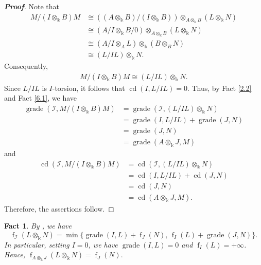 \documentclass[10pt,a4paper]{amsart}
\numberwithin{equation}{theorem}
\theoremstyle{definition}
\theoremstyle{fact}
\newtheorem{fact}[theorem]{Fact}
\theoremstyle{conjecture}
\newcommand{\f}{\operatorname{f}}
\newcommand{\grade}{\operatorname{grade}}
\newcommand{\cd}{\operatorname{cd}}
\newenvironment{prf}[1][Proof]{\begin{proof}[\bf #1]}{\end{proof}}
\begin{document}
\begin{prf}
Note that
$$\begin{array}{ll}
M/(I \otimes_\Bbbk B)M &\cong ((A \otimes_\Bbbk B)/(I \otimes_\Bbbk B))\otimes_{A \otimes_\Bbbk B} (L\otimes_\Bbbk N)\\
                       & \cong  (A/I\otimes_\Bbbk B/0)\otimes_{A \otimes_\Bbbk B} (L\otimes_\Bbbk N)\\
                       & \cong (A/I\otimes_A L)\otimes_\Bbbk (B\otimes_BN)\\
                       & \cong (L/IL) \otimes_\Bbbk N.
\end{array}$$
Consequently,
 \begin{eqnarray}	
\label{6.2.1}
M/(I \otimes_\Bbbk B)M \cong (L/IL) \otimes_\Bbbk N.
\end{eqnarray}
 Since $L/IL$ is $I$-torsion, it follows that $\cd(I, L/IL)=0$. Thus, by Fact \ref{2.2} and Fact \ref{6.1}, we have
$$\begin{array}{ll}
\grade(\mathcal{I}, M/(I \otimes_\Bbbk B)M) &=\grade(\mathcal{I}, (L/IL)\otimes_\Bbbk N)\\
                                            &= \grade(I, L/IL)+\grade(J, N)\\
                                            & =\grade(J, N)\\
                                            &=\grade(A \otimes_\Bbbk J, M)
\end{array}$$
and
$$\begin{array}{ll}
\cd(\mathcal{I}, M/(I \otimes_\Bbbk B)M)& =\cd(\mathcal{I}, (L/IL)\otimes_\Bbbk N)\\
                                        &= \cd(I, L/IL)+\cd(J, N)\\
                                        &=\cd(J, N)\\
                                        &=\cd(A \otimes_\Bbbk J, M).
\end{array}$$
 Therefore, the assertions  follow.
\end{prf}

\vspace{.2cm}
\vspace{.3cm}

\begin{fact}{\em
\label{6.3}
By \cite[Theorem 3.2]{R4}, we have
\[
\f_{\mathcal{I}}(L\otimes_{\Bbbk} N)
=
\min\bigl\{
\grade(I,L)+\f_J(N),\,
\f_I(L)+\grade(J,N)
\bigr\}.
\]
In particular, setting \(I=0\), we have
\(\grade(I, L)=0\) and \(\f_I(L)=+\infty\). Hence,
$
\f_{A\otimes_{\Bbbk} J}(L\otimes_{\Bbbk} N)
=\f_J(N).
$
}
\end{fact}
\end{document}
